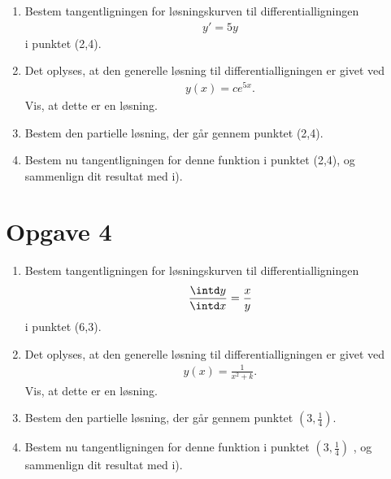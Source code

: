 \begin{enumerate}[label=\roman*)]
	\item Bestem tangentligningen for løsningskurven til differentialligningen
	\begin{align*}
		y' = 5y
	\end{align*}
	i punktet (2,4).
	\item Det oplyses, at den generelle løsning til differentialligningen er givet ved
	\begin{align*}
		y(x) = ce^{5x}.
	\end{align*}
	Vis, at dette er en løsning.
	\item Bestem den partielle løsning, der går gennem punktet (2,4).
	\item Bestem nu tangentligningen for denne funktion i punktet (2,4), og sammenlign dit 
	resultat med i).
\end{enumerate}

\section*{Opgave 4}
\begin{enumerate}[label=\roman*)]
	\item Bestem tangentligningen for løsningskurven til differentialligningen
	\begin{align*}
		\frac{\intd y}{\intd x} = \frac{x}{y}
	\end{align*}
	i punktet (6,3).
	\item Det oplyses, at den generelle løsning til differentialligningen er givet ved
	\begin{align*}
		y(x) = \frac{1}{x^2+k}.
	\end{align*}
	Vis, at dette er en løsning.
	\item Bestem den partielle løsning, der går gennem punktet $\left(3,\frac{1}{4}\right)$.
	\item Bestem nu tangentligningen for denne funktion i punktet $\left(3,\frac{1}{4}\right)$
	, og sammenlign dit 
	resultat med i).
\end{enumerate}
